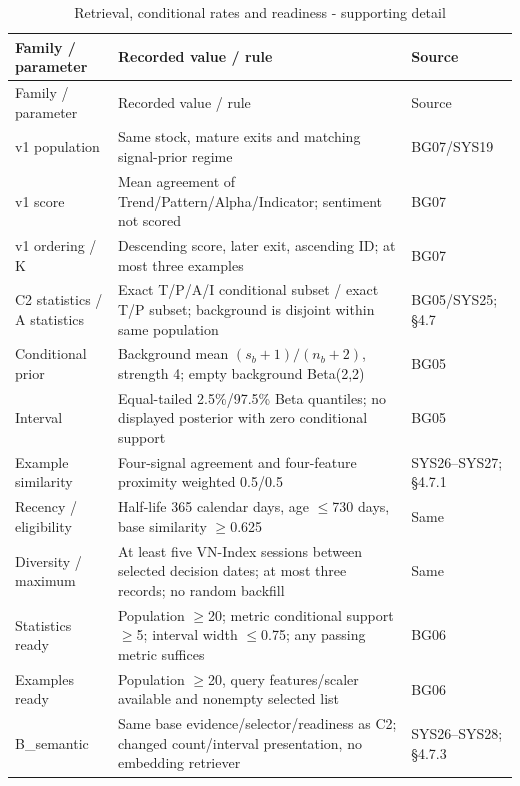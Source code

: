 \begin{longtable}[]{@{}
  >{\raggedright\arraybackslash}p{}
  >{\raggedright\arraybackslash}p{}
  >{\raggedright\arraybackslash}p{}@{}}
\caption{Retrieval, conditional rates and readiness - supporting detail}\label{tab:C_configuration:5}\tabularnewline
\toprule\noalign{}
Family / parameter
 & Recorded value / rule
 & Source
 \\
\midrule\noalign{}
\endfirsthead
\toprule\noalign{}
Family / parameter
 & Recorded value / rule
 & Source
 \\
\midrule\noalign{}
\endhead
\bottomrule\noalign{}
\endlastfoot
v1 population & Same stock, mature exits and matching signal-prior regime & BG07/SYS19 \\
v1 score & Mean agreement of Trend/Pattern/Alpha/Indicator; sentiment not scored & BG07 \\
v1 ordering / K & Descending score, later exit, ascending ID; at most three examples & BG07 \\
C2 statistics / A statistics & Exact T/P/A/I conditional subset / exact T/P subset; background is disjoint within same population & BG05/SYS25; §4.7 \\
Conditional prior & Background mean \((s_b+1)/(n_b+2)\), strength 4; empty background Beta(2,2) & BG05 \\
Interval & Equal-tailed 2.5\%/97.5\% Beta quantiles; no displayed posterior with zero conditional support & BG05 \\
Example similarity & Four-signal agreement and four-feature proximity weighted 0.5/0.5 & SYS26--SYS27; §4.7.1 \\
Recency / eligibility & Half-life 365 calendar days, age \ensuremath{\leq}730 days, base similarity \ensuremath{\geq}0.625 & Same \\
Diversity / maximum & At least five VN-Index sessions between selected decision dates; at most three records; no random backfill & Same \\
Statistics ready & Population \ensuremath{\geq}20; metric conditional support \ensuremath{\geq}5; interval width \ensuremath{\leq}0.75; any passing metric suffices & BG06 \\
Examples ready & Population \ensuremath{\geq}20, query features/scaler available and nonempty selected list & BG06 \\
B\_\allowbreak{}semantic & Same base evidence/selector/readiness as C2; changed count/interval presentation, no embedding retriever & SYS26--SYS28; §4.7.3 \\
\end{longtable}

